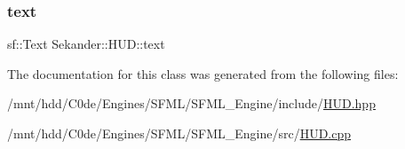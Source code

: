\subsubsection{\texorpdfstring{text}{text}}
{\footnotesize\ttfamily sf\+::\+Text Sekander\+::\+H\+U\+D\+::text\hspace{0.3cm}{\ttfamily [private]}}



The documentation for this class was generated from the following files\+:\begin{DoxyCompactItemize}
\item 
/mnt/hdd/\+C0de/\+Engines/\+S\+F\+M\+L/\+S\+F\+M\+L\+\_\+\+Engine/include/\hyperlink{HUD_8hpp}{H\+U\+D.\+hpp}\item 
/mnt/hdd/\+C0de/\+Engines/\+S\+F\+M\+L/\+S\+F\+M\+L\+\_\+\+Engine/src/\hyperlink{HUD_8cpp}{H\+U\+D.\+cpp}\end{DoxyCompactItemize}
